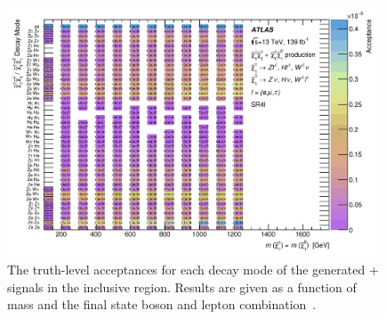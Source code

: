 \begin{figure}[tbp]
  \begin{center}
    \includegraphics[width=0.98\textwidth]{figs/rpvthreel/MC_Acc_MassvsProcess_SROL4l_emutau.png}
  \end{center}
  \caption[Signal acceptance by process in \SRFour]
          {The truth-level acceptances for each decay mode of the generated \CCsignal + \CNsignal signals in the inclusive \SRFour region. Results are given as a function of \chono mass and the final state boson and lepton combination~\cite{ATLAS:2020uer}.}
          \label{fig:AccSR4l}
\end{figure}

